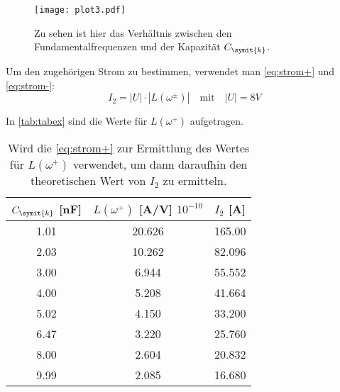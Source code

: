 \begin{figure}
  \centering
  \texttt{[image: plot3.pdf]}
  \caption{Zu sehen ist hier das Verhältnis zwischen den Fundamentalfrequenzen und der Kapazität \(C_{\symit{k}}\).}
  \label{fig:plot3}
\end{figure}
Um den zugehörigen Strom zu bestimmen, verwendet man \autoref{eq:strom+} und \autoref{eq:strom-}:
\begin{equation}
  I_2 = |U| \cdot |L(\omega^\pm)| \quad\textrm{mit}\quad |U| = 8V
\end{equation}

In \autoref{tab:tabex} sind die Werte für $L(\omega^+)$ aufgetragen.

\begin{table}
  \centering
  \caption{Wird die \autoref{eq:strom+} zur Ermittlung des Wertes für \(L(\omega^+)\) verwendet, um dann daraufhin den theoretischen Wert von \(I_2\) zu ermitteln.}
  \label{tab:tabex}
  \begin{tabular}{c c c}
    \toprule
   \(C_{\symit{k}}\) [nF] & \(L(\omega^+)\) [A/V] $10^{-10}$ & \(I_2\) [A] \\
   \midrule
    1.01 & 20.626 & 165.00\\
    2.03 & 10.262 & 82.096\\
    3.00 & 6.944 & 55.552\\
    4.00 & 5.208 & 41.664\\
    5.02 & 4.150 & 33.200\\
    6.47 & 3.220 & 25.760\\
    8.00 & 2.604 & 20.832\\
    9.99 & 2.085 & 16.680\\
    \bottomrule
  \end{tabular}
\end{table}